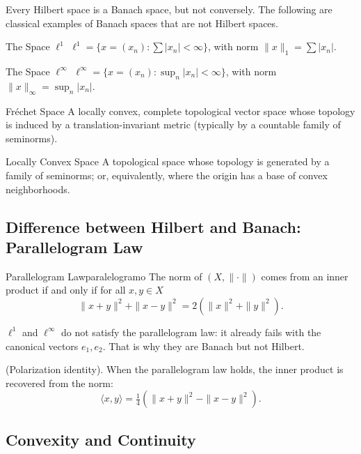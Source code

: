 \documentclass[11pt, a4paper]{article}
\begin{document}
Every Hilbert space is a Banach space, but not conversely. The following are classical examples of Banach spaces that are not
Hilbert spaces.

\begin{ejemplo}{The Space $\ell^1$}{}
$\ell^1 = \{x = (x_n) : \sum |x_n| < \infty\}$, with norm $\|x\|_1 = \sum |x_n|$.
\end{ejemplo}

\begin{ejemplo}{The Space $\ell^\infty$}{}
$\ell^\infty = \{x = (x_n) : \sup_n |x_n| < \infty\}$, with norm $\|x\|_\infty = \sup_n |x_n|$.
\end{ejemplo}

\begin{definicion}{Fréchet Space}{}
A locally convex, complete topological vector space whose topology is induced by
a translation-invariant metric (typically by a countable family of seminorms).
\end{definicion}

\begin{definicion}{Locally Convex Space}{}
A topological space whose topology is generated by a family of seminorms; or,
equivalently, where the origin has a base of convex neighborhoods.
\end{definicion}

\subsection{Difference between Hilbert and Banach: Parallelogram Law}

\begin{teorema}{Parallelogram Law}{paralelogramo}
The norm of $(X, \|\cdot\|)$ comes from an inner product if and only if for all $x, y \in X$
$$ \|x + y\|^2 + \|x - y\|^2 = 2(\|x\|^2 + \|y\|^2). $$
\end{teorema}

\obs $\ell^1$ and $\ell^\infty$ do not satisfy the parallelogram law: it already fails with the canonical vectors $e_1, e_2$.
That is why they are Banach but not Hilbert.

\obs (Polarization identity). When the parallelogram law holds, the inner product is recovered
from the norm:
$$ \langle x, y \rangle = \tfrac{1}{4}\left(\|x + y\|^2 - \|x - y\|^2\right). $$

\subsection{Convexity and Continuity}
\end{document}
